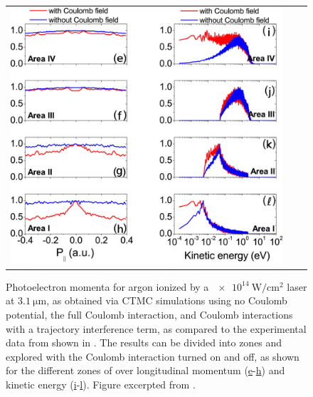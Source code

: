 \begin{figure}[hb]
\begin{tabular}{ccc}
  \includegraphics[height=\figuresixHheight]{6-LES/Figures/figure6Hb.png}
  \end{tabular}
  \caption[
  CTMC simulations of VLES V-shaped structure and NZES-like peak, performed by Q.Z. Xia et al.
  ]{
  Photoelectron momenta for argon ionized by a $\SI{e14}{\watt/\centi\meter^2}$ laser at $\SI{3.1}{\micro\meter}$, as obtained via CTMC simulations using \protect{} no Coulomb potential, \protect{} the full Coulomb interaction, and \protect{} Coulomb interactions with a trajectory interference term, as compared to the experimental data from  shown in \protect{}. The results can be divided into zones and explored with the Coulomb interaction turned on and off, as shown for the different zones of \protect{} over longitudinal momentum (\hyperref[f6-xia-original-figure-e]{e}-\hyperref[f6-xia-original-figure-h]{h}) and kinetic energy (\hyperref[f6-xia-original-figure-i]{i}-\hyperref[f6-xia-original-figure-l]{l}).
  Figure excerpted from .
  }
\label{f6-xia-original-figure}
\end{figure}




